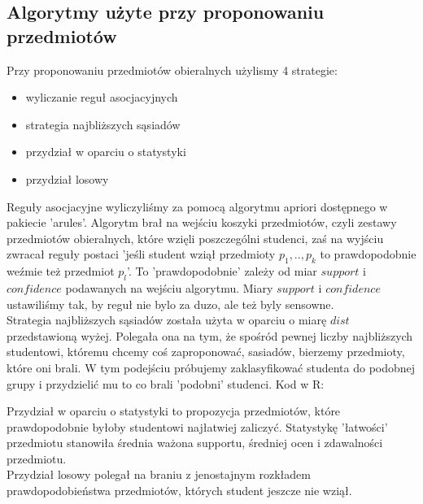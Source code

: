 \documentclass[licencjacka]{pracamgr}
\begin{document}
\subsection{Algorytmy użyte przy proponowaniu przedmiotów}
Przy proponowaniu przedmiotów obieralnych użylismy 4 strategie:
\begin{itemize}
 \item wyliczanie reguł asocjacyjnych
 \item strategia najbliższych sąsiadów
 \item przydział w oparciu o statystyki
 \item przydział losowy
\end{itemize}
Reguły asocjacyjne wyliczyliśmy za pomocą algorytmu apriori dostępnego w pakiecie 'arules'. Algorytm brał na wejściu koszyki
przedmiotów, czyli zestawy przedmiotów obieralnych, które wzięli poszczególni studenci, zaś na wyjściu zwracał reguły postaci
'jeśli student wziął przedmioty $p_{1},..,p_{k}$ to prawdopodobnie weźmie też przedmiot $p_{l}$'. To 'prawdopodobnie' 
zależy od miar $support$ i $confidence$ podawanych na wejściu algorytmu.
Miary $support$ i $confidence$ ustawiliśmy tak, by reguł nie bylo za duzo, ale też byly sensowne. \\
Strategia najbliższych sąsiadów została użyta w oparciu o miarę $dist$ przedstawioną wyżej. Polegała ona na tym, że 
spośród pewnej liczby najbliższych studentowi, któremu chcemy coś zaproponować, sasiadów, bierzemy przedmioty, które oni brali.
W tym podejściu próbujemy zaklasyfikować studenta do podobnej grupy i przydzielić mu to co brali 'podobni' studenci. Kod w R:

Przydział w oparciu o statystyki to propozycja przedmiotów, które prawdopodobnie byłoby studentowi najłatwiej zaliczyć.
Statystykę 'łatwości' przedmiotu stanowiła średnia ważona supportu, średniej ocen i zdawalności przedmiotu. \\
Przydział losowy polegał na braniu z jenostajnym rozkładem prawdopodobieństwa przedmiotów, których student jeszcze nie wziął.
\end{document}

